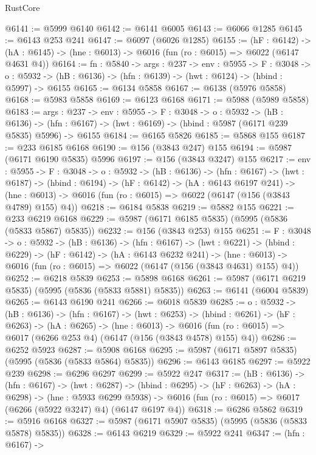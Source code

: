 \begin{lexlean}{RustCore}
\begin{coremodule}
@6141 := @5999 @6140
@6142 := @6141 @6005
@6143 := @6066 @1285
@6145 := @6143 @253 @241
@6147 := @6097 (@6026 @1285)
@6155 := (hF : @6142) ->
  (hA : @6145) -> (hne : @6013) -> @6016 (fun (ro : @6015) => @6022 (@6147 @4631 @4))
@6164 := {fn : @5840} ->
  {args : @237} ->
  {env : @5955} ->
  {F : @3048} ->
  {o : @5932} -> (hB : @6136) -> (hfn : @6139) -> (hwt : @6124) -> (hbind : @5997) -> @6155
@6165 := @6134 @5858
@6167 := @6138 (@5976 @5858)
@6168 := @5983 @5858
@6169 := @6123 @6168
@6171 := @5988 (@5989 @5858)
@6183 := {args : @237} ->
  {env : @5955} ->
  {F : @3048} ->
  {o : @5932} ->
  (hB : @6136) ->
  (hfn : @6167) -> (hwt : @6169) -> (hbind : @5987 (@6171 @239 @5835) @5996) -> @6155
@6184 := @6165 @5826
@6185 := @5868 @155
@6187 := @233 @6185 @6168
@6190 := @156 (@3843 @247) @155
@6194 := @5987 (@6171 @6190 @5835) @5996
@6197 := @156 (@3843 @3247) @155
@6217 := {env : @5955} ->
  {F : @3048} ->
  {o : @5932} ->
  (hB : @6136) ->
  (hfn : @6167) ->
  (hwt : @6187) ->
  (hbind : @6194) ->
  (hF : @6142) ->
  (hA : @6143 @6197 @241) ->
  (hne : @6013) -> @6016 (fun (ro : @6015) => @6022 (@6147 (@156 (@3843 @4789) @155) @4))
@6218 := @6184 @5838
@6219 := @5882 @155
@6221 := @233 @6219 @6168
@6229 := @5987 (@6171 @6185 @5835) (@5995 (@5836 (@5833 @5867) @5835))
@6232 := @156 (@3843 @253) @155
@6251 := {F : @3048} ->
  {o : @5932} ->
  (hB : @6136) ->
  (hfn : @6167) ->
  (hwt : @6221) ->
  (hbind : @6229) ->
  (hF : @6142) ->
  (hA : @6143 @6232 @241) ->
  (hne : @6013) -> @6016 (fun (ro : @6015) => @6022 (@6147 (@156 (@3843 @4631) @155) @4))
@6252 := @6218 @5839
@6253 := @5898 @6168
@6261 := @5987 (@6171 @6219 @5835) (@5995 (@5836 (@5833 @5881) @5835))
@6263 := @6141 (@6004 @5839)
@6265 := @6143 @6190 @241
@6266 := @6018 @5839
@6285 := {o : @5932} ->
  (hB : @6136) ->
  (hfn : @6167) ->
  (hwt : @6253) ->
  (hbind : @6261) ->
  (hF : @6263) ->
  (hA : @6265) ->
  (hne : @6013) ->
  @6016 (fun (ro : @6015) => @6017 (@6266 @253 @4) (@6147 (@156 (@3843 @4578) @155) @4))
@6286 := @6252 @5923
@6287 := @5908 @6168
@6295 := @5987 (@6171 @5897 @5835) (@5995 (@5836 (@5833 @5864) @5835))
@6296 := @6143 @6185
@6297 := @5922 @239
@6298 := @6296 @6297
@6299 := @5922 @247
@6317 := (hB : @6136) ->
  (hfn : @6167) ->
  (hwt : @6287) ->
  (hbind : @6295) ->
  (hF : @6263) ->
  (hA : @6298) ->
  (hne : @5933 @6299 @5938) ->
  @6016 (fun (ro : @6015) => @6017 (@6266 (@5922 @3247) @4) (@6147 @6197 @4))
@6318 := @6286 @5862
@6319 := @5916 @6168
@6327 := @5987 (@6171 @5907 @5835) (@5995 (@5836 (@5833 @5878) @5835))
@6328 := @6143 @6219
@6329 := @5922 @241
@6347 := (hfn : @6167) ->

\end{coremodule}
\end{lexlean}

